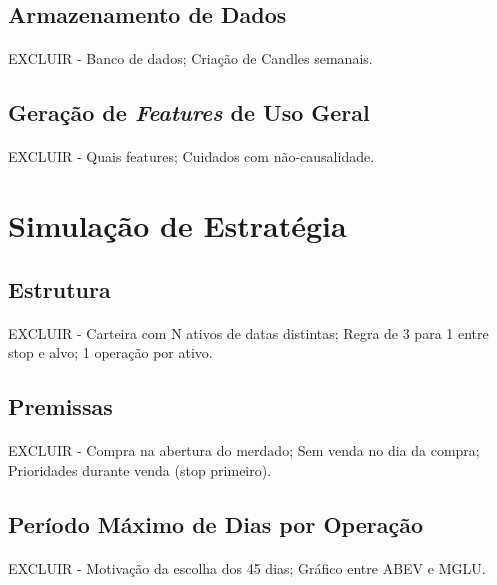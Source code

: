 \subsection{Armazenamento de Dados}
\paragraph{} EXCLUIR - Banco de dados; Criação de Candles semanais.

\subsection{Geração de \textit{Features} de Uso Geral}
\paragraph{} EXCLUIR - Quais features; Cuidados com não-causalidade.


\section{Simulação de Estratégia}

\subsection{Estrutura}
\paragraph{} EXCLUIR - Carteira com N ativos de datas distintas; Regra de 3 para 1 entre stop e alvo; 1 operação por ativo.

\subsection{Premissas}
\paragraph{} EXCLUIR - Compra na abertura do merdado; Sem venda no dia da compra; Prioridades durante venda (stop primeiro).

\subsection{Período Máximo de Dias por Operação}
\paragraph{} EXCLUIR - Motivação da escolha dos 45 dias; Gráfico entre ABEV e MGLU.

